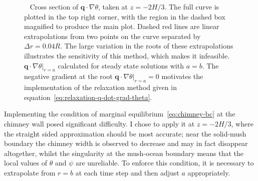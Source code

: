 \documentclass[11pt,twocolumn]{article}
\begin{document}
\begin{figure}[t!]
\centering
\captionsetup[subfigure]{position=top,singlelinecheck=off,justification=raggedright, aboveskip=-12pt,belowskip=0pt}
\begin{subfigure}[t]{.54\linewidth}
       	\centering
       	 \caption{}
       	\setlength\figureheight{5cm} 
	\setlength\figurewidth{7cm}
	
       	\label{subfig:q-dot-grad-theta}
\end{subfigure}
\quad
\captionsetup[subfigure]{aboveskip=-18pt}
\begin{subfigure}[t]{.42\linewidth}
       	\centering
        	\caption{}
      	\setlength\figureheight{5cm} 
	\setlength\figurewidth{4cm}
	
    	\label{subfig:q-dot-grad-theta-root}
\end{subfigure}

\setlength{\belowcaptionskip}{-7pt} %

\caption{~ Cross section of $\mathbf{q} \cdot \nabla \theta$, taken at $z=-2H/3$. The full curve is plotted in the top right corner, with the region in the dashed box magnified to produce the main plot. Dashed red lines are linear extrapolations from two points on the curve separated by $\Delta r = 0.04R$. The large variation in the roots of these extrapolations illustrates the sensitivity of this method, which makes it infeasible.~ $ \left. \mathbf{q} \cdot \nabla \theta \right|_{r=a}$ calculated for steady state solutions with $a=b$. The negative gradient at the root $ \left. \mathbf{q} \cdot \nabla \theta \right|_{r=a} = 0$ motivates the implementation of the relaxation method given in equation~\eqref{eq:relaxation-q-dot-grad-theta}. }
\label{fig:free-boundary-method}  

\end{figure}

Implementing the condition of marginal equilibrium~\eqref{eq:chimney-bc} at the chimney wall posed significant difficulty. I chose to apply it at $z = - 2H/3$, where the straight sided approximation should be most accurate; near the solid-mush boundary the chimney width is observed to decrease and may in fact disappear altogether, whilst the singularity at the mush-ocean boundary means that the local values of $\theta$ and $\psi$ are unreliable. To enforce this condition, it is necessary to extrapolate from $r=b$ at each time step and then adjust $a$ appropriately. 
\end{document}
